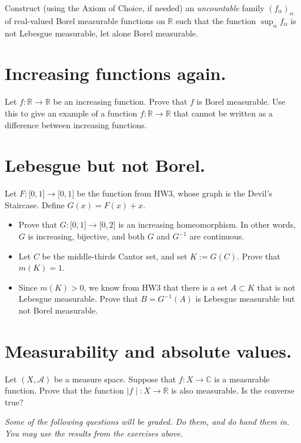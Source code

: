 \documentclass{qlnotes-export}
\begin{document}
Construct (using the Axiom of Choice, if needed) an \emph{uncountable} family \((f_{\alpha})_{\alpha}\) of real-valued Borel measurable functions on \(\mathbb{R}\) such that the function \(\sup_{\alpha}f_{\alpha}\) is not Lebesgue measurable, let alone Borel measurable.

\section{Increasing functions again.}

Let \(f:{\mathbb{R}}\rightarrow{\mathbb{R}}\) be an increasing function. Prove that \(f\) is Borel measurable. Use this to give an example of a function \(f:{\mathbb{R}}\rightarrow{\mathbb{R}}\) that cannot be written as a difference between increasing functions.

\section{Lebesgue but not Borel.}

Let \(F:\lbrack 0,1\rbrack\rightarrow\lbrack 0,1\rbrack\) be the function from HW3, whose graph is the Devil's Staircase. Define \(G(x) = F(x) + x\).

\begin{itemize}
\item
  Prove that \(G:\lbrack 0,1\rbrack\rightarrow\lbrack 0,2\rbrack\) is an increasing homeomorphism. In other words, \(G\) is increasing, bijective, and both \(G\) and \(G^{- 1}\) are continuous.
\item
  Let \(C\) be the middle-thirds Cantor set, and set \(K := G(C)\). Prove that \(m(K) = 1\).
\item
  Since \(m(K) > 0\), we know from HW3 that there is a set \(A \subset K\) that is not Lebesgue measurable. Prove that \(B = G^{- 1}(A)\) is Lebesgue measurable but not Borel measurable.
\end{itemize}

\section{Measurability and absolute values.}

Let \((X,\mathcal{A})\) be a measure space. Suppose that \(f:X\rightarrow{\mathbb{C}}\) is a measurable function. Prove that the function \(\left. |f \middle| :X\rightarrow{\mathbb{R}} \right.\) is also measurable. Is the converse true?

\emph{Some of the following questions will be graded. Do them, and do hand them in. You may use the results from the exercises above}.
\end{document}
